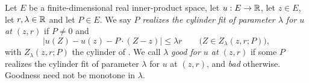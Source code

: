 \begin{definition}
Let $E$ be a finite-dimensional real inner-product space, let $u:E\to\mathbb{R}$, let
$z\in E$, let $r,\lambda\in\mathbb{R}$ and let $P\in E$. We say $P$ \emph{realizes the
cylinder fit of parameter $\lambda$ for $u$ at $(z,r)$} if $P\ne0$ and
\[
  |u(Z)-u(z)-P\cdot(Z-z)|\le\lambda r
       \qquad\bigl(Z\in Z_\lambda(z,r;P)\bigr),
\]
with $Z_\lambda(z,r;P)$ the cylinder of . We call $\lambda$
\emph{good for $u$ at $(z,r)$} if some $P$ realizes the cylinder fit of
parameter $\lambda$ for $u$ at $(z,r)$, and \emph{bad} otherwise. Goodness need
not be monotone in $\lambda$.
\end{definition}
